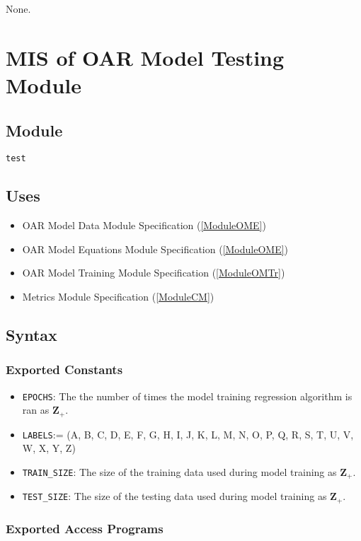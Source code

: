 \documentclass[12pt, titlepage]{article}
\def\code#1{\texttt{#1}}
\begin{document}
None.

\section{MIS of OAR Model Testing Module} \label{ModuleOMTs} 

\subsection{Module}

\code{test}

\subsection{Uses}

\begin{itemize}
  \item OAR Model Data Module Specification (\ref{ModuleOME})
  \item OAR Model Equations Module Specification (\ref{ModuleOME})
  \item OAR Model Training Module Specification (\ref{ModuleOMTr})
  \item Metrics Module Specification (\ref{ModuleCM})
\end{itemize}

\subsection{Syntax}

\subsubsection{Exported Constants}

\begin{itemize}
\item \code{EPOCHS}: The the number of times the model training regression algorithm is ran as $\mathbf{Z}_{+}$.
\item \code{LABELS}:= (A, B, C, D, E, F, G, H, I, J, K, L, M, N, O, P, Q, R, S, T, U, V, W, X, Y, Z)
\item \code{TRAIN\_SIZE}: The size of the training data used during model training as $\mathbf{Z}_{+}$.
\item \code{TEST\_SIZE}: The size of the testing data used during model training as $\mathbf{Z}_{+}$.
\end{itemize}

\subsubsection{Exported Access Programs}
\end{document}
